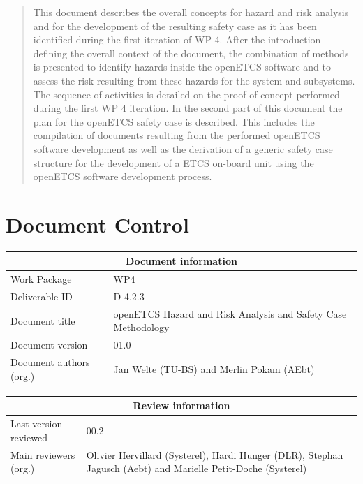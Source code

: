 \documentclass{template/openetcs_report}
\begin{document}



\begin{abstract}
This document describes the overall concepts for hazard and risk analysis and for the development of the resulting safety case as it has been identified during the first iteration of WP 4.
After the introduction defining the overall context of the document, the combination of methods is presented to identify hazards inside the openETCS software and to assess the risk resulting from these hazards for the system and subsystems. The sequence of activities is detailed on the proof of concept performed during the first WP 4 iteration. In the second part of this document the plan for the openETCS safety case is described. This includes the compilation of documents resulting from the performed openETCS software development as well as the derivation of a generic safety case structure for the development of a ETCS on-board unit using the openETCS software development process.
\end{abstract}

\maketitle
\tableofcontents
\listoffiguresandtables
\newpage

\chapter{Document Control}

\begin{tabular}{|p{4.4cm}|p{8.7cm}|}
\hline
\multicolumn{2}{|c|}{Document information} \\
\hline
Work Package &  WP4  \\
Deliverable ID & D 4.2.3\\
\hline
Document title & openETCS Hazard and Risk Analysis and Safety Case Methodology \\
Document version & 01.0 \\
Document authors (org.)  & Jan Welte (TU-BS) and Merlin Pokam (AEbt)\\
\hline
\end{tabular}

\begin{tabular}{|p{4.4cm}|p{8.7cm}|}
\hline
\multicolumn{2}{|c|}{Review information} \\
\hline
Last version reviewed & 00.2 \\
\hline
Main reviewers (org.) & Olivier Hervillard	(Systerel), Hardi Hunger (DLR), Stephan Jagusch (Aebt) and Marielle Petit-Doche (Systerel) \\
\hline
\end{tabular}
\end{document}
